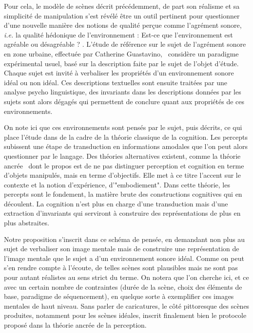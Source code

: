 Pour cela, le modèle de scènes décrit précédemment, de part son réalisme et sa simplicité de manipulation s'est révélé être un outil pertinent pour questionner d'une nouvelle manière des notions de qualité perçue comme l'agrément sonore, \textit{i.e.} la qualité hédonique de l’environnement : \og Est-ce que l’environnement est agréable ou désagréable ? \fg. L'étude de référence sur le sujet de l'agrément sonore en zone urbaine, effectuée par Catherine Guastavino,~\cite{guastavino2006ideal} considère un paradigme expérimental usuel, basé sur la description faite par le sujet de l'objet d'étude. Chaque sujet est invité à verbaliser les propriétés d'un environnement sonore idéal ou non idéal. Ces descriptions textuelles sont ensuite traitées par une analyse psycho linguistique, des invariants dans les descriptions données par les sujets sont alors dégagés qui permettent de conclure quant aux propriétés de ces environnements.

On note ici que ces environnements sont pensés par le sujet, puis décrits, ce qui place l'étude dans de la cadre de la théorie classique de la cognition. Les percepts subissent une étape de transduction en informations amodales que l'on peut alors questionner par le langage. Des théories alternatives existent, comme la théorie ancrée~\cite{barsalou2010grounded} dont le propos est de ne pas distinguer perception et cognition en terme d'objets manipulés, mais en terme d'objectifs. Elle met à ce titre l'accent sur le contexte et la notion d'expérience, d'"embodiement". Dans cette théorie, les percepts sont le fondement, la matière brute des constructions cognitives qui en découlent. La cognition n'est plus en charge d'une transduction mais d'une extraction d'invariants qui serviront à construire des représentations de plus en plus abstraites. 

Notre proposition s'inscrit dans ce schéma de pensée, en demandant non plus au sujet de verbaliser son image mentale mais de \og construire \fg une représentation de l'image mentale que le sujet a d'un environnement sonore idéal. Comme on peut s'en rendre compte à l'écoute, de telles scènes sont plausibles mais ne sont pas pour autant réalistes au sens strict du terme. On notera que l'on cherche ici, et ce avec un certain nombre de contraintes (durée de la scène, choix des éléments de base, paradigme de séquencement), en quelque sorte à exemplifier ces images mentales de haut niveau. Sans parler de caricatures, le côté pittoresque des scènes produites, notamment pour les scènes idéales, inscrit finalement bien le protocole proposé dans la théorie ancrée de la perception.

